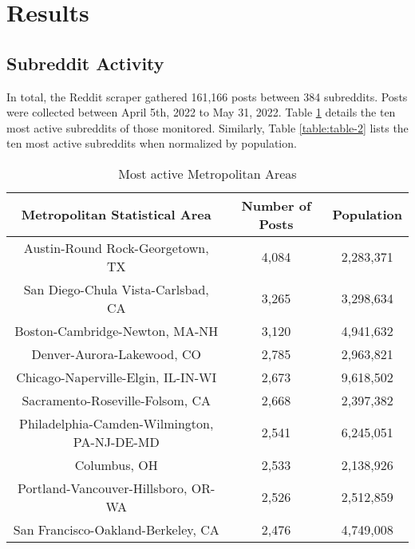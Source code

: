 \documentclass[12pt,oneside, letterpaper]{book}
\begin{document}
\section{Results}

\subsection{Subreddit Activity}

\par In total, the Reddit scraper gathered 161,166 posts between 384 subreddits. Posts were collected between April 5th, 2022 to May 31, 2022. Table \ref{table:table-1} details the ten most active subreddits of those monitored. Similarly, Table \ref{table:table-2} lists the ten most active subreddits when normalized by population.

\begin{table}[h!]
    \centering
    \small
    \caption{Most active Metropolitan Areas}
    \begin{tabular}{| c | c | c |}
    \hline
    Metropolitan Statistical Area & Number of Posts & Population\\ \hline
    Austin-Round Rock-Georgetown, TX & 4,084 & 2,283,371 \\ \hline
    San Diego-Chula Vista-Carlsbad, CA & 3,265 & 3,298,634 \\ \hline
    Boston-Cambridge-Newton, MA-NH & 3,120 & 4,941,632 \\ \hline
    Denver-Aurora-Lakewood, CO & 2,785 & 2,963,821 \\ \hline
    Chicago-Naperville-Elgin, IL-IN-WI & 2,673 & 9,618,502 \\ \hline
    Sacramento-Roseville-Folsom, CA & 2,668 & 2,397,382 \\ \hline
    Philadelphia-Camden-Wilmington, PA-NJ-DE-MD & 2,541 & 6,245,051 \\ \hline
    Columbus, OH & 2,533 & 2,138,926 \\ \hline
    Portland-Vancouver-Hillsboro, OR-WA & 2,526 & 2,512,859 \\ \hline
    San Francisco-Oakland-Berkeley, CA & 2,476 & 4,749,008 \\ \hline
	\end{tabular}
	\label{table:table-1}
\end{table}
\end{document}
